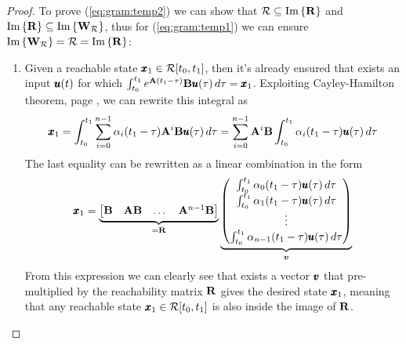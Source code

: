 	\begin{proof}
		To prove (\ref{eq:gram:temp2}) we can show that $\mathcal R \subseteq \textrm{Im}\left\{\mathbf{R}\right\}$ and $\textrm{Im}\left\{\mathbf{R}\right\} \subseteq \textrm{Im}\left\{\mathbf{W}_\mathcal R\right\}$, thus for (\ref{eq:gram:temp1}) we can ensure $\textrm{Im}\left\{\mathbf{W}_\mathcal R\right\} = \mathcal R = \textrm{Im}\left\{\mathbf{R}\right\}$:
		\begin{enumerate}[\itshape a)]
			\item Given a reachable state $\pmb{x}_1 \in \mathcal R[t_0,t_1]$, then it's already ensured that exists an input $\pmb{u}(t)$ for which $\int_{t_0}^{t_1} e^{\mathbf{A}(t_1-\tau) } \mathbf{B} \pmb{u}(\tau)\, d\tau = \pmb{x}_1$. Exploiting Cayley-Hamilton theorem, page \pageref{th:cayley}, we can rewrite this integral as
			\[ \pmb{x}_1 = \int_{t_0}^{t_1} \sum_{i=0}^{n-1} \alpha_i(t_1-\tau) \mathbf{A}^i \mathbf{B} \pmb{u}(\tau)\, d\tau = \sum_{i=0}^{n-1} \mathbf{A}^i \mathbf{B} \int_{t_0}^{t_1} \alpha_i(t_1-\tau) \pmb{u}(\tau)\, d\tau \]
			The last equality can be rewritten as a linear combination in the form
			\[ \pmb{x}_1 = \underbrace{\begin{bmatrix} \mathbf{B} & \mathbf{A} \mathbf{B} & \dots & \mathbf{A}^{n-1} \mathbf{B} \end{bmatrix}}_{=\mathbf{R}} \underbrace{\begin{pmatrix}  \int_{t_0}^{t_1} \alpha_0(t_1-\tau)\pmb{u}(\tau)\, d\tau \\ \int_{t_0}^{t_1} \alpha_1(t_1-\tau)\pmb{u}(\tau)\, d\tau \\ \vdots \\ \int_{t_0}^{t_1} \alpha_{n-1}(t_1-\tau)\pmb{u}(\tau)\, d\tau  \end{pmatrix}}_{\boldsymbol{v}}  \]
			From this expression we can clearly see that exists a vector $\pmb{v}$ that pre-multiplied by the reachability matrix $\mathbf{R}$ gives the desired state $\pmb{x}_1$, meaning that any reachable state $\pmb{x}_1 \in \mathcal R[t_0,t_1]$ is also inside the image of $\mathbf{R}$.
			

\end{enumerate}
\end{proof}
